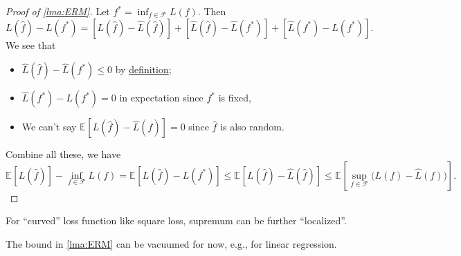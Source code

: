 \begin{proof}[Proof of \autoref{lma:ERM}]
	Let \(f^{\ast} = \inf _{f\in \mathscr{F} } L(f)\). Then
	\[
		L(\hat{f} ) - L(f^{\ast} )
		= [L(\hat{f} ) - \hat{L} (\hat{f} )] + [\hat{L} (\hat{f} ) - \hat{L} (f^{\ast} )] + [\hat{L} (f^{\ast} ) - L(f^{\ast} )].
	\]
	We see that
	\begin{itemize}
		\item \(\hat{L} (\hat{f} ) - \hat{L} (f^{\ast} ) \leq 0\) by \hyperref[prb:ERM]{definition};
		\item \(\hat{L} (f^{\ast} ) - L(f^{\ast} ) = 0\) in expectation since \(f^{\ast} \) is fixed,
		\item We can't say \(\mathbb{E}_{}[L(\hat{f} ) - \hat{L} (\hat{f} ) ] = 0\) since \(\hat{f} \) is also random.
	\end{itemize}
	Combine all these, we have
	\[
		\mathbb{E}_{}[L(\hat{f} ) ] - \inf _{f\in \mathscr{F} } L(f)
		= \mathbb{E}_{}[ L(\hat{f} ) - L(f^{\ast} ) ]
		\leq \mathbb{E}_{}[ L(\hat{f} ) - \hat{L} (\hat{f} ) ]
		\leq \mathbb{E}_{}\left[ \sup _{f\in \mathscr{F} } \big(L(f) - \hat{L} (f) \big) \right].
	\]
\end{proof}

\begin{remark}
	For ``curved'' loss function like square loss, supremum can be further ``localized''.
\end{remark}

\begin{remark}
	The bound in \autoref{lma:ERM} can be vacuumed for now, e.g., for linear regression.
\end{remark}

